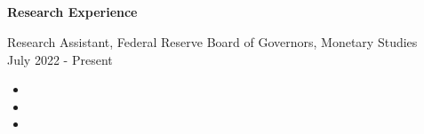 \documentclass[margin, 11pt]{res} %
\begin{document}
\begin{resume}













\section{}


\textbf{Research Experience}


Research Assistant, Federal Reserve Board of Governors, Monetary Studies \\ 
July 2022 - Present
	\begin{itemize}
		\item  
		\item  
		\item 
	\end{itemize}


\end{resume}
\end{document}
